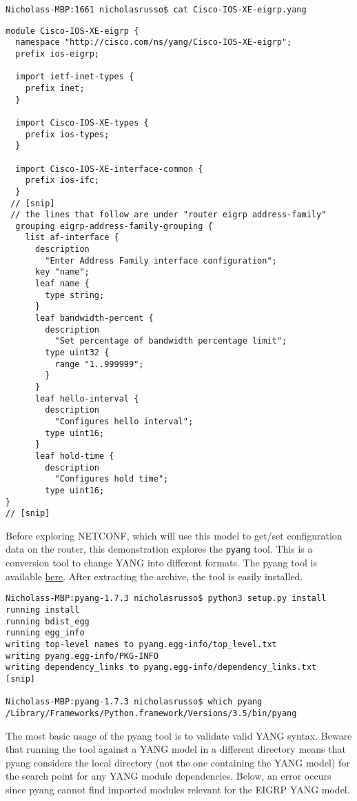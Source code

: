 \begin{verbatim}
Nicholass-MBP:1661 nicholasrusso$ cat Cisco-IOS-XE-eigrp.yang
\end{verbatim}

\begin{verbatim}
module Cisco-IOS-XE-eigrp {
  namespace "http://cisco.com/ns/yang/Cisco-IOS-XE-eigrp";
  prefix ios-eigrp;

  import ietf-inet-types {
    prefix inet;
  }

  import Cisco-IOS-XE-types {
    prefix ios-types;
  }

  import Cisco-IOS-XE-interface-common {
    prefix ios-ifc;
  }
 // [snip]
 // the lines that follow are under "router eigrp address-family"
  grouping eigrp-address-family-grouping {
    list af-interface {
      description
        "Enter Address Family interface configuration";
      key "name";
      leaf name {
        type string;
      }
      leaf bandwidth-percent {
        description
          "Set percentage of bandwidth percentage limit";
        type uint32 {
          range "1..999999";
        }
      }
      leaf hello-interval {
        description
          "Configures hello interval";
        type uint16;
      }
      leaf hold-time {
        description
          "Configures hold time";
        type uint16;
}
// [snip]
\end{verbatim}

Before exploring NETCONF, which will use this model to get/set configuration
data on the router, this demonstration explores the \verb|pyang| tool. This is a
conversion tool to change YANG into different formats. The pyang tool is
available \href{https://pypi.python.org/pypi/pyang}{here}. After extracting the
archive, the tool is easily installed.

\begin{verbatim}
Nicholass-MBP:pyang-1.7.3 nicholasrusso$ python3 setup.py install
running install
running bdist_egg
running egg_info
writing top-level names to pyang.egg-info/top_level.txt
writing pyang.egg-info/PKG-INFO
writing dependency_links to pyang.egg-info/dependency_links.txt
[snip]

Nicholass-MBP:pyang-1.7.3 nicholasrusso$ which pyang
/Library/Frameworks/Python.framework/Versions/3.5/bin/pyang
\end{verbatim}

The most basic usage of the pyang tool is to validate valid YANG syntax.
Beware that running the tool against a YANG model in a different directory
means that pyang considers the local directory (not the one containing the
YANG model) for the search point for any YANG module dependencies. Below, an
error occurs since pyang cannot find imported modules relevant for the EIGRP
YANG model.

